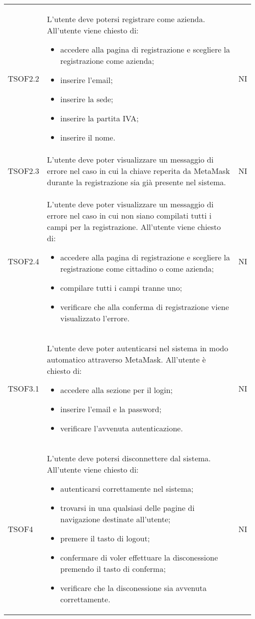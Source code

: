 \begin{longtable}{ >{\centering}p{} >{\centering}p{}
			>{\centering}p{}}
		 TSOF2.2	&	L'utente deve potersi registrare come azienda. All'utente viene chiesto di:
		\begin{itemize}
			\item accedere alla pagina di registrazione e scegliere la registrazione
			come azienda;
			\item inserire l'email;
			\item inserire la sede;
			\item inserire la partita IVA;
			\item inserire il nome.
		\end{itemize}	&	NI
		\tabularnewline
		
		 TSOF2.3	&	L'utente deve poter visualizzare un messaggio di errore nel caso in cui la
		chiave reperita da MetaMask\glo{} durante la registrazione sia già presente
		nel sistema.	&	NI
		\tabularnewline
			
		 TSOF2.4	&	L'utente deve poter visualizzare un messaggio di errore nel caso in cui non
		siano compilati tutti i campi per la registrazione. All'utente viene chiesto di:
		\begin{itemize}
			\item accedere alla pagina di registrazione e scegliere la registrazione
			come cittadino o come azienda;
			\item compilare tutti i campi tranne uno;
			\item verificare che alla conferma di registrazione viene visualizzato
			l'errore.
		\end{itemize}	&	NI
		\tabularnewline
		
		 TSOF3.1	&	L'utente deve poter autenticarsi nel sistema in modo automatico attraverso
		MetaMask\glo{}. All'utente è chiesto di:
		\begin{itemize}
			\item accedere alla sezione per il login;
			\item inserire l'email e la password;
			\item verificare l'avvenuta autenticazione.
		\end{itemize}	&	NI
		\tabularnewline
		
		TSOF4	&	L'utente deve potersi disconnettere dal sistema. All'utente viene chiesto di:
		\begin{itemize}
			\item autenticarsi correttamente nel sistema;
			\item trovarsi in una qualsiasi delle pagine di navigazione destinate 
			all'utente;
			\item premere il tasto di logout;
			\item confermare di voler effettuare la disconessione premendo il tasto 
			di conferma;
			\item verificare che la disconessione sia avvenuta correttamente.
		\end{itemize}	&	NI
		\tabularnewline
		

\end{longtable}
